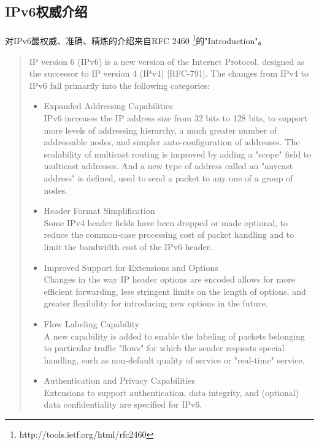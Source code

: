 \documentclass[a4paper,14pt,openany]{article}
\begin{document}
\subsection{IPv6权威介绍}
\paragraph{}
对IPv6最权威、准确、精炼的介绍来自RFC 2460 \footnote{http://tools.ietf.org/html/rfc2460}的"Introduction"。
\begin{quote}
IP version 6 (IPv6) is a new version of the Internet Protocol,
   designed as the successor to IP version 4 (IPv4) [RFC-791].  The
   changes from IPv4 to IPv6 fall primarily into the following
   categories:

\begin{itemize}
\item{Expanded Addressing Capabilities}
\\
         IPv6 increases the IP address size from 32 bits to 128 bits, to
         support more levels of addressing hierarchy, a much greater
         number of addressable nodes, and simpler auto-configuration of
         addresses.  The scalability of multicast routing is improved by
         adding a "scope" field to multicast addresses.  And a new type
         of address called an "anycast address" is defined, used to send
         a packet to any one of a group of nodes.

\item{Header Format Simplification}
\\
         Some IPv4 header fields have been dropped or made optional, to
         reduce the common-case processing cost of packet handling and
         to limit the bandwidth cost of the IPv6 header.

\item{Improved Support for Extensions and Options}
\\

         Changes in the way IP header options are encoded allows for
         more efficient forwarding, less stringent limits on the length
         of options, and greater flexibility for introducing new options
         in the future.

  \item{Flow Labeling Capability}
\\
         A new capability is added to enable the labeling of packets
         belonging to particular traffic "flows" for which the sender
         requests special handling, such as non-default quality of
         service or "real-time" service.
         
  \item{Authentication and Privacy Capabilities}
\\
         Extensions to support authentication, data integrity, and
         (optional) data confidentiality are specified for IPv6.
\end{itemize}
\end{quote}
\end{document}
